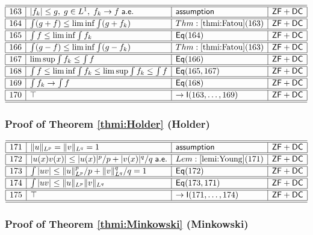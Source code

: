 \documentclass[11pt,reqno]{amsart}
\begin{document}
\noindent$%
\begin{array}{|r|l|l|l|}
\hline\hline
163 & |f_{k}|\le g,\;g\in L^{1},\;f_{k}\to f\;\mathsf{a.e.} & \mathsf{assumption} & \mathsf{ZF+DC} \\ \hline\hline
164 & \int(g+f)\le\liminf\int(g+f_{k}) & Thm:\ref{thmi:Fatou}(163) & \mathsf{ZF+DC} \\ \hline\hline
165 & \int f\le\liminf\int f_{k} & \mathsf{Eq}(164) & \mathsf{ZF+DC} \\ \hline\hline
166 & \int(g-f)\le\liminf\int(g-f_{k}) & Thm:\ref{thmi:Fatou}(163) & \mathsf{ZF+DC} \\ \hline\hline
167 & \limsup\int f_{k}\le\int f & \mathsf{Eq}(166) & \mathsf{ZF+DC} \\ \hline\hline
168 & \int f\le\liminf\int f_{k}\le\limsup\int f_{k}\le\int f & \mathsf{Eq}(165,167) & \mathsf{ZF+DC} \\ \hline\hline
169 & \int f_{k}\to\int f & \mathsf{Eq}(168) & \mathsf{ZF+DC} \\ \hline\hline
170 & \top & \to\mathsf{I}(163,\dots,169) & \mathsf{ZF+DC} \\ \hline\hline
\end{array}%
$

\medskip

\subsubsection*{Proof of Theorem \ref{thmi:Holder} (\textsf{Holder})}

\noindent$%
\begin{array}{|r|l|l|l|}
\hline\hline
171 & \|u\|_{L^{p}}=\|v\|_{L^{q}}=1 & \mathsf{assumption} & \mathsf{ZF+DC} \\ \hline\hline
172 & |u(x)v(x)|\le|u(x)|^{p}/p+|v(x)|^{q}/q\;\mathsf{a.e.} & Lem:\ref{lemi:Young}(171) & \mathsf{ZF+DC} \\ \hline\hline
173 & \int|uv|\le\|u\|_{L^{p}}^{p}/p+\|v\|_{L^{q}}^{q}/q=1 & \mathsf{Eq}(172) & \mathsf{ZF+DC} \\ \hline\hline
174 & \int|uv|\le\|u\|_{L^{p}}\|v\|_{L^{q}} & \mathsf{Eq}(173,171) & \mathsf{ZF+DC} \\ \hline\hline
175 & \top & \to\mathsf{I}(171,\dots,174) & \mathsf{ZF+DC} \\ \hline\hline
\end{array}%
$

\medskip

\subsubsection*{Proof of Theorem \ref{thmi:Minkowski} (\textsf{Minkowski})}
\end{document}
